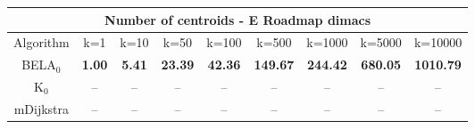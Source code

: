 \begin{tabular}{c|cccccccc}\toprule
\multicolumn{9}{c}{Number of centroids - E Roadmap dimacs}\\ \midrule
Algorithm & k=1 & k=10 & k=50 & k=100 & k=500 & k=1000 & k=5000 & k=10000 \\ \midrule
BELA$_0$ & \textbf{1.00} & \textbf{5.41} & \textbf{23.39} & \textbf{42.36} & \textbf{149.67} & \textbf{244.42} & \textbf{680.05} & \textbf{1010.79} \\
K$_0$ & -- & -- & -- & -- & -- & -- & -- & -- \\
mDijkstra & -- & -- & -- & -- & -- & -- & -- & -- \\ \bottomrule 
\end{tabular}
